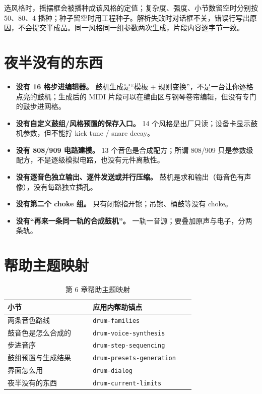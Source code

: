 选风格时，摇摆框会被播种成该风格的定值；复杂度、强度、小节数留空时分别按 50、80、4 播种；种子留空时用工程种子。解析失败时对话框不关，错误行写出原因，不会提交半成品。同一风格同一组参数两次生成，片段内容逐字节一致。




\section{夜半没有的东西}

\begin{itemize}
  \item \textbf{没有 16 格步进编辑器。} 鼓机生成是“模板 + 规则变换”，不是一台让你逐格点亮的鼓机；生成后的 MIDI 片段可以在编曲区与钢琴卷帘编辑，但没有专门的鼓步进网格。
  \item \textbf{没有自定义鼓组/风格预置的保存入口。} 14 个风格是出厂只读；设备卡显示鼓机参数，但不能拧 kick tune / snare decay。
  \item \textbf{没有 808/909 电路建模。} 13 个音色是合成配方；所谓 808/909 只是参数级配方，不是逐级模拟电路，也没有元件离散性。
  \item \textbf{没有逐音色独立输出、逐件发送或并行压缩。} 鼓机是求和输出（每音色有声像），没有每路独立插孔。
  \item \textbf{没有第二个 choke 组。} 只有闭镲掐开镲；吊镲、桶鼓等没有 choke。
  \item \textbf{没有“再来一条同一轨的合成鼓机”。} 一轨一音源；要叠加原声与电子，分两条轨。
\end{itemize}

\section{帮助主题映射}

\begin{table}[htbp]
\centering
\small
\begin{tabular}{@{}p{0.40\linewidth}p{0.48\linewidth}@{}}
\hline
小节 & 应用内帮助锚点 \\
\hline
两条音色路线 & \texttt{drum-families} \\
鼓音色是怎么合成的 & \texttt{drum-voice-synthesis} \\
步进音序 & \texttt{drum-step-sequencing} \\
鼓组预置与生成结果 & \texttt{drum-presets-generation} \\
界面怎么用 & \texttt{drum-dialog} \\
夜半没有的东西 & \texttt{drum-current-limits} \\
\hline
\end{tabular}
\caption{第 6 章帮助主题映射}
\end{table}

